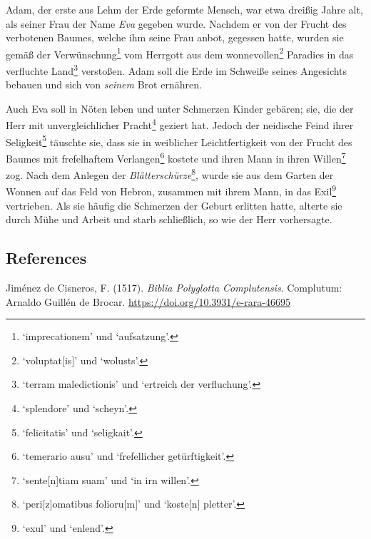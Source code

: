 \documentclass[
]{article}
\begin{document}
Adam, der erste aus Lehm der Erde geformte Mensch, war etwa dreißig
Jahre alt, als seiner Frau der Name \emph{Eva} gegeben wurde. Nachdem er
von der Frucht des verbotenen Baumes, welche ihm seine Frau anbot,
gegessen hatte, wurden sie gemäß der Verwünschung\footnote{`imprecationem'
  und `aufsatzung'.} vom Herrgott aus dem wonnevollen\footnote{`voluptat{[}is{]}'
  und `wolusts'.} Paradies in das verfluchte Land\footnote{`terram
  maledictionis' und `ertreich der verfluchung'.} verstoßen. Adam soll
die Erde im Schweiße seines Angesichts bebauen und sich von
\emph{seinem} Brot ernähren.

Auch Eva soll in Nöten leben und unter Schmerzen Kinder gebären; sie,
die der Herr mit unvergleichlicher Pracht\footnote{`splendore' und
  `scheyn'.} geziert hat. Jedoch der neidische Feind ihrer
Seligkeit\footnote{`felicitatis' und `seligkait'.} täuschte sie, dass
sie in weiblicher Leichtfertigkeit von der Frucht des Baumes mit
frefelhaftem Verlangen\footnote{`temerario ausu' und `frefellicher
  getürftigkeit'.} kostete und ihren Mann in ihren Willen\footnote{`sente{[}n{]}tiam
  suam' und `in irn willen'.} zog. Nach dem Anlegen der
\emph{Blätterschürze}\footnote{`peri{[}z{]}omatibus folioru{[}m{]}' und
  `koste{[}n{]} pletter'.}, wurde sie aus dem Garten der Wonnen auf das
Feld von Hebron, zusammen mit ihrem Mann, in das Exil\footnote{`exul'
  und `enlend'.} vertrieben. Als sie häufig die Schmerzen der Geburt
erlitten hatte, alterte sie durch Mühe und Arbeit und starb schließlich,
so wie der Herr vorhersagte.

\hypertarget{references}{%
\subsection{References}\label{references}}

Jiménez de Cisneros, F. (1517). \emph{Biblia Polyglotta Complutensis}.
Complutum: Arnaldo Guillén de Brocar.
\url{https://doi.org/10.3931/e-rara-46695}
\end{document}
